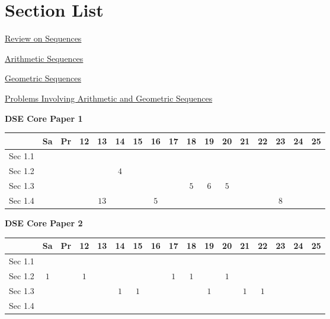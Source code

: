 \documentclass[12pt, a4paper]{article}
\begin{document}
\section*{Section List}
\begin{enumx}[label=Sec 1.\arabic*\ ]
\item \hyperref[section:6-1-1]{Review on Sequences}
\item \hyperref[section:6-1-2]{Arithmetic Sequences \NF}
\item \hyperref[section:6-1-3]{Geometric Sequences \NF}
\item \hyperref[section:6-1-4]{Problems Involving  Arithmetic and Geometric  Sequences \NF}
\end{enumx}
\begin{absolutelynopagebreak}
\begin{center}
\textbf{DSE Core Paper 1}
\end{center}
\begin{center}
\begin{tabular}{|l|c|c|c|c|c|c|c|c|c|c|c|c|c|c|c|c|}
\hline
        & Sa & Pr & 12 & 13 & 14 & 15 & 16 & 17 & 18 & 19 & 20 & 21 & 22 & 23 & 24 & 25 \\\hline\hline
Sec 1.1 &  &  &  &  &  &  &  &  &  &  &  &  &  &  &  &  \\\hline
Sec 1.2 &  &  &  &  &  $4$ &  &  &  &  &  &  &  &  &  &  &  \\\hline
Sec 1.3 &  &  &  &  &  &  &  &  &  $5$ &  $6$ &  $5$ &  &  &  &  &  \\\hline
Sec 1.4 &  &  &  &  $13$ &  &  &  $5$ &  &  &  &  &  &  &  $8$ &  &  \\\hline
\end{tabular}
\end{center}
\end{absolutelynopagebreak}
\begin{absolutelynopagebreak}
\begin{center}
\textbf{DSE Core Paper 2}
\end{center}
\begin{center}
\begin{tabular}{|l|c|c|c|c|c|c|c|c|c|c|c|c|c|c|c|c|}
\hline
        & Sa & Pr & 12 & 13 & 14 & 15 & 16 & 17 & 18 & 19 & 20 & 21 & 22 & 23 & 24 & 25 \\\hline\hline
Sec 1.1 &  &  &  &  &  &  &  &  &  &  &  &  &  &  &  &  \\\hline
Sec 1.2 &  $1$ &  &  $1$ &  &  &  &  &  $1$ &  $1$ &  &  $1$ &  &  &  &  &  \\\hline
Sec 1.3 &  &  &  &  &  $1$ &  $1$ &  &  &  &  $1$ &  &  $1$ &  $1$ &  &  &  \\\hline
Sec 1.4 &  &  &  &  &  &  &  &  &  &  &  &  &  &  &  &  \\\hline
\end{tabular}
\end{center}
\end{absolutelynopagebreak}
\end{document}
